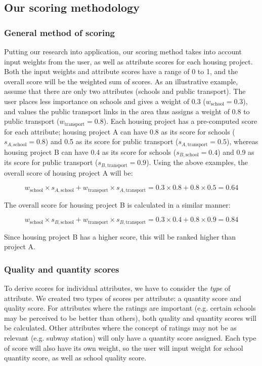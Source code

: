 \documentclass[a4paper, 11pt]{article}
\begin{document}
    \subsection{Our scoring methodology}

\subsubsection{General method of scoring}

    Putting our research into application, our scoring method takes into account input weights from the user, as well as attribute scores for each housing project. Both the input weights and attribute scores have a range of 0 to 1, and the overall score will be the weighted sum of scores. As an illustrative example, assume that there are only two attributes (schools and public transport). The user places less importance on schools and gives a weight of  0.3 ($w_{\text{school}}  = 0.3$), and values the public transport links in the area thus assigns a weight of 0.8 to public transport ($w_{\text{transport}}  = 0.8$). Each housing project has a pre-computed score for each attribute; housing project A can have 0.8 as its score for schools ($s_{A,\text{school}} = 0.8$) and 0.5 as its score for public transport ($s_{A,\text{transport}} = 0.5$), whereas housing project B can have 0.4 as its score for schools ($s_{B,\text{school}} = 0.4$) and 0.9 as its score for public transport ($s_{B,\text{transport}} = 0.9$). Using the above examples, the overall score of housing project A will be:

\[ w_{\text{school}} \times s_{A,\text{school}} + w_{\text{transport}} \times s_{A,\text{transport}} = 0.3 \times 0.8 + 0.8 \times 0.5 = 0.64 \]

The overall score for housing project B is calculated in a similar manner:

    \[ w_{\text{school}} \times s_{B,\text{school}} + w_{\text{transport}} \times s_{B,\text{transport}} = 0.3 \times 0.4 + 0.8 \times 0.9 = 0.84 \]

Since housing project B has a higher score, this will be ranked higher than project A.

\subsubsection{Quality and quantity scores}

To derive scores for individual attributes, we have to consider the \textit{type} of attribute. We created two types of scores per attribute: a quantity score and quality score.  For attributes where the ratings are important (e.g. certain schools may be perceived to be better than others), both quality and quantity scores will be calculated. Other attributes where the concept of ratings may not be as relevant (e.g. subway station) will only have a quantity score assigned. Each type of score will also have its own weight, so the user will input weight for school quantity score, as well as school quality score.
\end{document}
